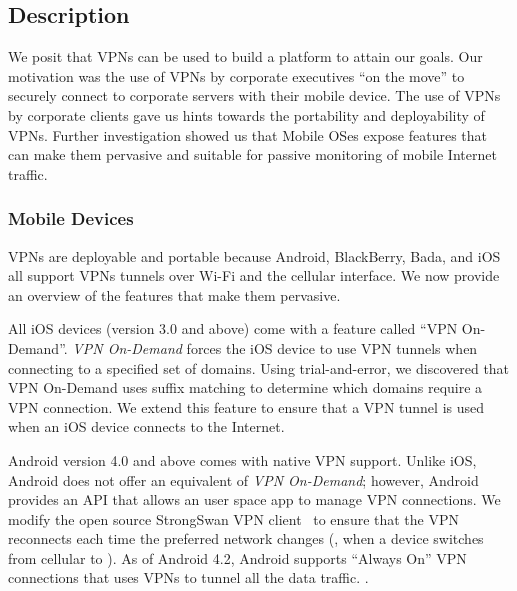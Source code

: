 \subsection{Description}
\label{sec:description}

We posit that VPNs can be used to build a platform to attain our goals.
Our motivation was the use of VPNs by corporate executives ``on the move'' to securely connect to corporate servers with their mobile device. 
The use of VPNs by corporate clients gave us hints towards the portability and deployability of VPNs.
Further investigation showed us that Mobile OSes expose features that can make them pervasive and suitable for passive monitoring of mobile Internet traffic.  

\subsubsection{Mobile Devices}

VPNs are deployable and portable because Android, BlackBerry, Bada, and iOS all support VPNs tunnels over Wi-Fi and the cellular interface.
We now provide an overview of the features that make them pervasive. 

All iOS devices (version 3.0 and above) come with a feature called ``VPN On-Demand''. 
\emph{VPN On-Demand} forces the iOS device to use VPN tunnels when connecting to a specified set of domains. 
Using trial-and-error, we discovered that VPN On-Demand uses suffix matching to determine which domains require a VPN connection. 
We extend this feature to ensure that a VPN tunnel is used when an iOS device connects to the Internet.

Android version 4.0 and above comes with native VPN support. 
Unlike iOS, Android does not offer an equivalent of \emph{VPN On-Demand}; however, Android provides an API that allows an user space app to manage VPN connections. 
We modify the open source StrongSwan VPN client~\cite{strongswanclient} to ensure that the VPN reconnects each time the preferred network changes (\eg, when a device switches from cellular to \wifi). 
As of Android 4.2, Android supports ``Always On'' VPN connections that uses VPNs to tunnel all the data traffic. 
.


